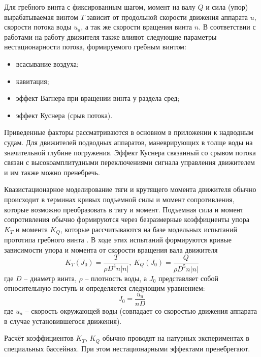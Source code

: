 Для гребного винта с фиксированным шагом, момент на валу $Q$ и сила (упор) вырабатываемая винтом $T$ зависит от продольной скорости движения аппарата $u$, скорости потока воды $u_a$, а так же скорости вращения винта $n$.
В соответствии с работами \cite{newman2018marine, breslin1996hydrodynamics, carlton2018marine} на работу движителя также влияют следующие параметры нестационарности потока, формируемого гребным винтом:
\begin{itemize}
    \item всасывание воздуха;
    \item кавитация;
    \item эффект Вагнера при вращении винта у раздела сред;
    \item эффект Куснера (срыв потока).
\end{itemize}

Приведенные факторы рассматриваются в основном в приложении к надводным судам.
Для движителей подводных аппаратов, маневрирующих в толще воды на значительной глубине погружения.
Эффект Куснера связанный со срывом потока связан с высокоамплитудными переключениями сигнала управления движителем и им также можно пренебречь.

Квазистационарное моделирование тяги и крутящего момента движителя обычно происходит в терминах кривых подъемной силы и момент сопротивления, которые возможно преобразовать в тягу и момент.
Подъемная сила и момент сопротивления обычно формируются через безразмерные коэффициенты упора $K_T$ и момента $K_Q$, которые рассчитываются на базе модельных испытаний прототипа гребного винта \cite{daidola1992propeller}.
В ходе этих испытаний формируются кривые зависимости упора и момента от скорости вращения вала движителя
\begin{equation}
    \label{eq:propeler_model}
    K_T (J_0) = \frac{T}{\rho D^4 n |n|}, \:
    K_Q (J_0) = \frac{Q}{\rho D^5 n |n|}    
\end{equation}
\noindent где $D$ -- диаметр винта, $\rho$ -- плотность воды, а $J_0$ представляет собой относительную поступь и определяется следующим уравнением:
\begin{equation*}
    J_0 = \frac{u_a}{nD}
\end{equation*}
\noindent где $u_a$ -- скорость окружающей воды (совпадает со скоростью движения аппарата в случае установившегося движения).

Расчёт коэффициентов $K_T$, $K_Q$ обычно проводят на натурных экспериментах в специальных бассейнах.
При этом нестационарными эффектами пренебрегают.

